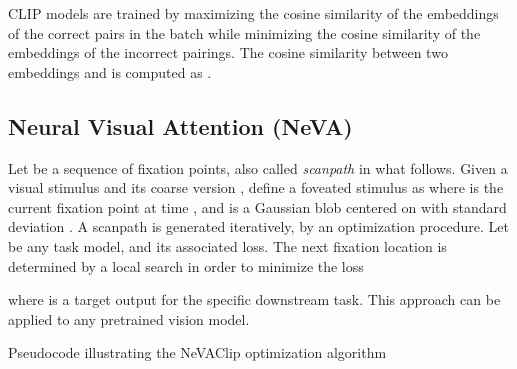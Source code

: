 \documentclass{article}
\begin{document}
CLIP models are trained by maximizing the cosine similarity of the embeddings of the  correct pairs in the batch while minimizing the cosine similarity of the embeddings of the  incorrect pairings. The cosine similarity between two embeddings  and  is computed as .

\subsection{Neural Visual Attention (NeVA)}
Let  be a sequence of fixation points, also called \textit{scanpath} in what follows. Given a visual stimulus  and its coarse version , \citet{schwinn2022behind} define a foveated stimulus as  
where  is the current fixation point at time , and  is a Gaussian blob centered on  with standard deviation . A scanpath is generated iteratively, by an optimization procedure. Let  be any task model, and  its associated loss. The next fixation location  is determined by a local search in order to minimize the loss 

where  is a target output for the specific downstream task. This approach can be applied to any pretrained vision model.


\newcommand\mycommfont[1]{\footnotesize\ttfamily\textcolor{blue}{#1}}
\begin{algorithm}
\caption{Pseudocode illustrating the NeVAClip optimization algorithm}\label{alg:nevaclip}
\BlankLine
{}
\BlankLine


\end{algorithm}
\end{document}
